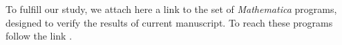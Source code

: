 To fulfill our study, we attach here a link to the set of \emph{Mathematica} programs, designed to verify the results of current manuscript.
To reach these programs follow the link \cite{GitMathematica}.